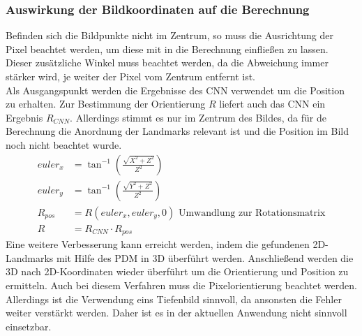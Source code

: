 \subsubsection{Auswirkung der Bildkoordinaten auf die Berechnung}
Befinden sich die Bildpunkte nicht im Zentrum, so muss die Ausrichtung der Pixel beachtet werden, um diese mit in die Berechnung einfließen zu lassen. Dieser zusätzliche Winkel muss beachtet werden, da die Abweichung immer stärker wird, je weiter der Pixel vom Zentrum entfernt ist.\\ 
Als Ausgangspunkt werden die Ergebnisse des CNN verwendet um die Position zu erhalten. Zur Bestimmung der Orientierung $R$ liefert auch das CNN ein Ergebnis $R_{CNN}$. Allerdings stimmt es nur im Zentrum des Bildes, da für de Berechnung die Anordnung der Landmarks relevant ist und die Position im Bild noch nicht beachtet wurde.\\
\begin{align*}
euler_x &= \tan^{-1}(\frac{\sqrt{X^2+Z^2}}{Z^2})\\
euler_y &= \tan^{-1}(\frac{\sqrt{Y^2+Z^2}}{Z^2})\\
R_{pos} &= R(euler_x,euler_y,0)\text{ Umwandlung zur Rotationsmatrix}\\
R &= R_{CNN}\cdot R_{pos}
\end{align*}
Eine weitere Verbesserung kann erreicht werden, indem die gefundenen 2D-Landmarks mit Hilfe des PDM in 3D überführt werden. Anschließend werden die 3D nach 2D-Koordinaten wieder überführt um die Orientierung und Position zu ermitteln. Auch bei diesem Verfahren muss die Pixelorientierung beachtet werden. Allerdings ist die Verwendung eins Tiefenbild sinnvoll, da ansonsten die Fehler weiter verstärkt werden. Daher ist es in der aktuellen Anwendung nicht sinnvoll einsetzbar.\cite{OpenFace}
